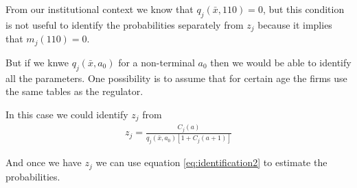 \documentclass[12pt]{article}
\theoremstyle{plain}
\theoremstyle{plain}
\begin{document}
From our institutional context we know  that   $ q_j(\bar{x},110) =0$, but this condition is not useful to identify the probabilities separately from $z_j$ because it implies that $m_j(110) =0$. 

But if we knwe $ q_j(\bar{x},a_0)$ for a non-terminal $a_0$ then we would be able to identify all the parameters. One possibility is to assume that for certain age the firms use the same tables as the regulator. 

In this case we could identify $z_j$ from 
\begin{align}\label{eq:identification3}
     z_j  =\frac{C_j(a)}{ q_j(\bar{x}, a_0)[1+C_j(a+1)]}
\end{align}

And once we have $z_j$ we can use equation \ref{eq:identification2} to estimate the probabilities. 
\end{document}
